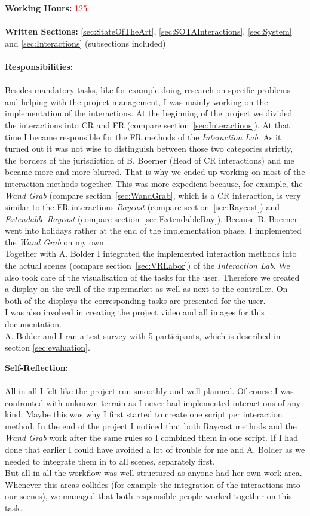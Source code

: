 \textbf{Working Hours:} \textcolor{red}{125} \\ \\
\textbf{Written Sections:} \ref{sec:StateOfTheArt},  \ref{sec:SOTAInteractions}, \ref{sec:System} and \ref{sec:Interactions} (subsections included) \\ \\
\textbf{Responsibilities:}\\ \\
Besides mandatory tasks, like for example doing research on specific problems and helping with the project management, I was mainly working on the implementation of the interactions. At the beginning of the project we divided the interactions into CR and FR (compare section~\ref{sec:Interactions}). At that time I became responsible for the FR methods of the \textit{Interaction Lab}. As it turned out it was not wise to distinguish between those two categories strictly, the borders of the jurisdiction of B. Boerner (Head of CR interactions) and me became more and more blurred. That is why we ended up working on most of the interaction methods together. This was more expedient because, for example, the \textit{Wand Grab} (compare section~\ref{sec:WandGrab}, which is a CR interaction, is very similar to the FR interactions \textit{Raycast} (compare section~\ref{sec:Raycast}) and \textit{Extendable Raycast} (compare section~\ref{sec:ExtendableRay}). Because B. Boerner went into holidays rather at the end of the implementation phase, I implemented the \textit{Wand Grab} on my own. \\
Together with A. Bolder I integrated the implemented interaction methods into the actual scenes (compare section~\ref{sec:VRLabor}) of the \textit{Interaction Lab}. We also took care of the visualisation of the tasks for the user. Therefore we created a display on the wall of the supermarket as well as next to the controller. On both of the displays the corresponding tasks are presented for the user. \\
I was also involved in creating the project video and all images for this documentation.\\
A. Bolder and I ran a test survey with 5 participants, which is described in section \ref{sec:evaluation}.

\textbf{Self-Reflection:}\\ \\
All in all I felt like the project run smoothly and well planned. Of course I was confronted with unknown terrain as I never had implemented interactions of any kind. Maybe this was why I first started to create one script per interaction method. In the end of the project I noticed that both Raycast methods and the \textit{Wand Grab} work after the same rules so I combined them in one script. If I had done that earlier I could have avoided a lot of trouble for me and A. Bolder as we needed to integrate them in to all scenes, separately first. \\
But all in all the workflow was well structured as anyone had her own work area. Whenever this areas collides (for example the integration of the interactions into our scenes), we managed that both responsible people worked together on this task.

